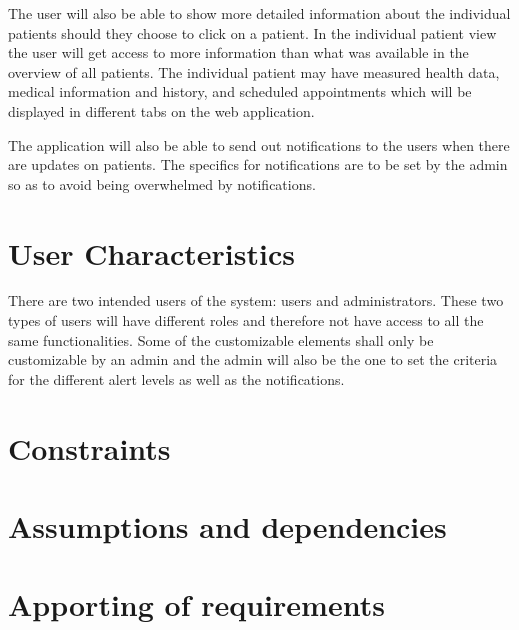 \documentclass{scrreprt}
\begin{document}
The user will also be able to show more detailed information about the individual patients should they choose to click on a patient. In the individual patient view the user will get access to more information than what was available in the overview of all patients. The individual patient may have measured health data, medical information and history, and scheduled appointments which will be displayed in different tabs on the web application.


The application will also be able to send out notifications to the users when there are updates on patients. The specifics for notifications are to be set by the admin so as to avoid being overwhelmed by notifications. 

\section{User Characteristics}
There are two intended users of the system: users and administrators. These two types of users will have different roles and therefore not have access to all the same functionalities. Some of the customizable elements shall only be customizable by an admin and the admin will also be the one to set the criteria for the different alert levels as well as the notifications.


\section{Constraints}


\section{Assumptions and dependencies}

\section{Apporting of requirements}
\end{document}
